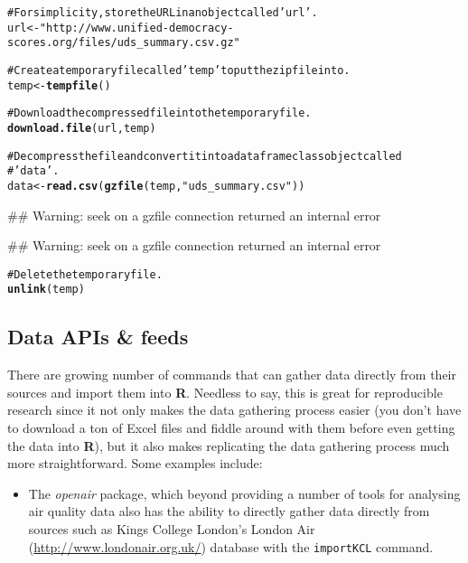 \documentclass[ChapterTOCs,krantz1]{krantz}\usepackage{graphicx, color}
\makeatletter
\newcommand{\hlfunctioncall}[1]{\textcolor[rgb]{0.501960784313725,0,0.329411764705882}{\textbf{#1}}}%
\newcommand{\hlstring}[1]{\textcolor[rgb]{0.6,0.6,1}{#1}}%
\newcommand{\hlcomment}[1]{\textcolor[rgb]{0.180392156862745,0.6,0.341176470588235}{#1}}%
\newenvironment{kframe}{%
 \def\at@end@of@kframe{}%
 \ifinner\ifhmode%
  \def\at@end@of@kframe{\end{minipage}}%
  \begin{minipage}{\columnwidth}%
 \fi\fi%
 \def\FrameCommand##1{\hskip\@totalleftmargin \hskip-\fboxsep
 \colorbox{shadecolor}{##1}\hskip-\fboxsep
     \hskip-\linewidth \hskip-\@totalleftmargin \hskip\columnwidth}%
 \MakeFramed {\advance\hsize-\width
   \@totalleftmargin\z@ \linewidth\hsize
   \@setminipage}}%
 {\par\unskip\endMakeFramed%
 \at@end@of@kframe}
\newenvironment{knitrout}{}{} %
\makeatother
\begin{document}
\begin{knitrout}
\color{fgcolor}\begin{kframe}
\begin{alltt}
\hlcomment{# For simplicity, store the URL in an object called \hlstring{'url'}.}
url <- \hlstring{"http://www.unified-democracy-scores.org/files/uds_summary.csv.gz"}

\hlcomment{# Create a temporary file called \hlstring{'temp'} to put the zip file into.}
temp <- \hlfunctioncall{tempfile}()

\hlcomment{# Download the compressed file into the temporary file.}
\hlfunctioncall{download.file}(url, temp)

\hlcomment{# Decompress the file and convert it into a dataframe class object called}
\hlcomment{# \hlstring{'data'}.}
data <- \hlfunctioncall{read.csv}(\hlfunctioncall{gzfile}(temp, \hlstring{"uds_summary.csv"}))
\end{alltt}
\begin{flushleft}\ttfamily\noindent\textcolor{warningcolor}{\#\# Warning: seek on a gzfile connection returned an internal error}\end{flushleft}\begin{flushleft}\ttfamily\noindent\textcolor{warningcolor}{\#\# Warning: seek on a gzfile connection returned an internal error}\end{flushleft}\begin{alltt}

\hlcomment{# Delete the temporary file.}
\hlfunctioncall{unlink}(temp)
\end{alltt}
\end{kframe}
\end{knitrout}


\subsection{Data APIs \& feeds}

There are growing number of commands that can gather data directly from
their sources and import them into \textbf{R}. Needless to say, this is
great for reproducible research since it not only makes the data
gathering process easier (you don't have to download a ton of Excel
files and fiddle around with them before even getting the data into
\textbf{R}), but it also makes replicating the data gathering process
much more straightforward. Some examples include:

\begin{itemize}
    \item The \emph{openair} package, which beyond providing a number of tools for analysing air quality data also has the ability to directly gather data directly from sources such as Kings College London's London Air (\url{http://www.londonair.org.uk/}) database with the \texttt{importKCL} command.
\end{itemize}
\end{document}
